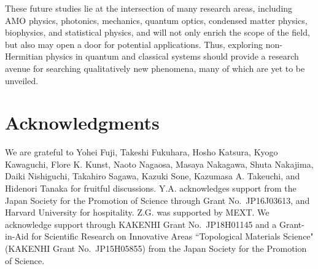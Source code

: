\documentclass{tADP2e}
\theoremstyle{plain}
\theoremstyle{plain}
\theoremstyle{definition}
\begin{document}
These future studies lie at the intersection of many research areas, including AMO physics, photonics, mechanics, quantum optics, condensed matter physics, biophysics, and statistical physics, and will not only enrich the scope of the field, but also may open a door for  potential applications. Thus, exploring non-Hermitian physics in quantum and classical systems should provide a research avenue for searching qualitatively new phenomena, many of which are yet to be unveiled.


\section*{Acknowledgments}
We are grateful to Yohei Fuji, Takeshi Fukuhara, Hosho Katsura, Kyogo Kawaguchi, Flore K. Kunst, Naoto Nagaosa, Masaya Nakagawa, Shuta Nakajima, Daiki Nishiguchi, Takahiro Sagawa, Kazuki Sone, Kazumasa A. Takeuchi, and Hidenori Tanaka for fruitful discussions. 
Y.A. acknowledges support from the Japan Society for the Promotion of Science through Grant No.~JP16J03613, and Harvard University for hospitality. Z.G. was supported by MEXT. We acknowledge support through KAKENHI Grant No.~JP18H01145 and a Grant-in-Aid for Scientific Research on Innovative Areas ``Topological Materials
Science" (KAKENHI Grant No.~JP15H05855) from the Japan Society for the Promotion of Science.  
\end{document}
